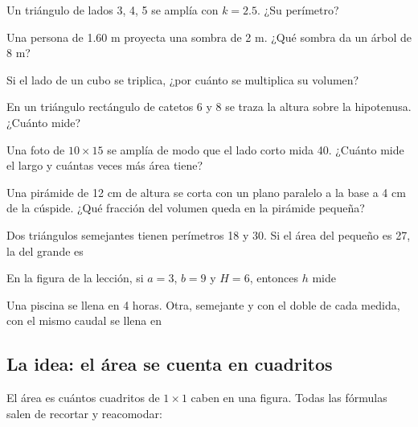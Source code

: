 \taller
{}
\begin{ejercicios}
\item Un triángulo de lados 3, 4, 5 se amplía con $k = 2.5$. ¿Su perímetro? 
\item Una persona de 1.60 m proyecta una sombra de 2 m. ¿Qué sombra da un árbol de 8 m? 
\item Si el lado de un cubo se triplica, ¿por cuánto se multiplica su volumen? 
\end{ejercicios}
\begin{ejercicios}
\item En un triángulo rectángulo de catetos 6 y 8 se traza la altura sobre la hipotenusa. ¿Cuánto mide? 
\item Una foto de $10 \times 15$ se amplía de modo que el lado corto mida 40. ¿Cuánto mide el largo y cuántas veces más área tiene? 
\item Una pirámide de 12 cm de altura se corta con un plano paralelo a la base a 4 cm de la cúspide. ¿Qué fracción del volumen queda en la pirámide pequeña? 
\end{ejercicios}
\begin{ejercicios}
\item Dos triángulos semejantes tienen perímetros 18 y 30. Si el área del pequeño es 27, la del grande es
\item En la figura de la lección, si $a = 3$, $b = 9$ y $H = 6$, entonces $h$ mide
\item Una piscina se llena en 4 horas. Otra, semejante y con el doble de cada medida, con el mismo caudal se llena en
\end{ejercicios}

\bitacora


\subsection{La idea: el área se cuenta en cuadritos}
El área es cuántos cuadritos de $1 \times 1$ caben en una figura. Todas las fórmulas salen de recortar y reacomodar:

